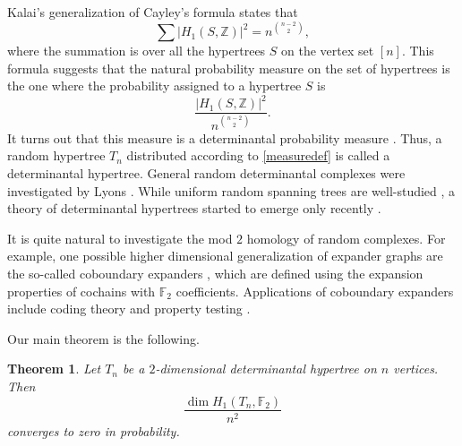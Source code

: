 \documentclass[11pt,a4paper]{article}
\theoremstyle{plain}
\newtheorem{theorem}{Theorem}[section]
\theoremstyle{definition}
\begin{document}
Kalai's generalization of Cayley's formula \cite{kalai1983enumeration} states that
\[\sum |H_{1}(S,\mathbb{Z})|^2=n^{{n-2}\choose {2}},\]
where the summation is over all the  hypertrees $S$ on the vertex set $[n]$. This formula suggests that the natural probability measure on the set of  hypertrees is the one where the probability assigned to a hypertree $S$ is \begin{equation}\label{measuredef}
    \frac{|H_{1}(S,\mathbb{Z})|^2}{n^{{n-2}\choose {2}}}.
\end{equation}
It turns out that this measure is a determinantal probability measure \cite{lyons2003determinantal,hough2006determinantal}. Thus, a random hypertree $T_n$ distributed according to \eqref{measuredef} is called a determinantal hypertree. General random determinantal complexes were investigated by Lyons \cite{lyons2009random}. While uniform random spanning trees are well-studied \cite{ald1,ald2,ald3,grimmett1980random,szekeres2006distribution,lyons2017probability}, a theory of determinantal hypertrees started to emerge only recently  \cite{kahle2022topology,meszaros2022local,werf2022determinantal,linial2019enumeration,meszaros2023coboundary,meszaros20242}.

It is quite natural to investigate the mod $2$ homology of random complexes. For example, one possible higher dimensional generalization of  expander graphs are the so-called coboundary expanders \cite{lubotzky2018high,gromov2010singularities,linial2006homological}, which are defined using the expansion properties of cochains with $\mathbb{F}_2$ coefficients.  Applications of coboundary
expanders include coding theory and property testing \cite{codes1,codes2,codes3,kaufman2014high}. 

Our main theorem is the following.
\begin{theorem}\label{thm1}
    Let $T_n$ be a $2$-dimensional determinantal hypertree on $n$ vertices. Then
    \[\frac{\dim H_1(T_n,\mathbb{F}_2)}{n^2}\]
    converges to zero in probability.
\end{theorem}
\end{document}
